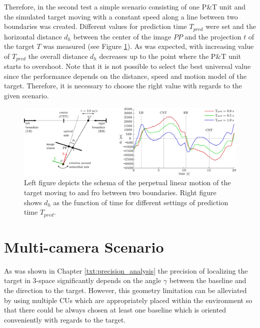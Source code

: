 Therefore, in the second test a simple scenario consisting of one P\&T unit and the simulated target moving with a constant speed along a line between two boundaries was created. Different values for prediction time $T_{pred}$ were set and the horizontal distance $d_{h}$ between the center of the image $PP$ and the projection $t$ of the target $T$ was measured (see Figure \ref{fig:test_motion_predict}). As was expected, with increasing value of $T_{pred}$ the overall distance $d_{h}$ decreases up to the point where the P\&T unit starts to overshoot. Note that it is not possible to select the best universal value since the performance depends on the distance, speed and motion model of the target. Therefore, it is necessary to choose the right value with regards to the given scenario.

\begin{figure}[htb]\centering
	\centering
	\includegraphics[width=0.95\linewidth]{fig/schema_defile_and_motion_prediction.pdf}
	\caption{Left figure depicts the schema of the perpetual linear motion of the target moving to and fro between two boundaries. Right figure shows $d_{h}$ as the function of time for different settings of prediction time $T_{pred}$.}
	\label{fig:test_motion_predict}
\end{figure}

\section{Multi-camera Scenario} \label{txt:multi-camera_scenario}

As was shown in Chapter \ref{txt:precision_analysis} the precision of localizing the target in 3-space significantly depends on the angle $\gamma$ between the baseline and the direction to the target. However, this geometry limitation can be alleviated by using multiple CUs which are appropriately placed within the environment so that there could be always chosen at least one baseline which is oriented conveniently with regards to the target.

